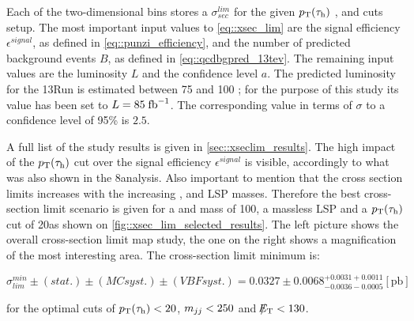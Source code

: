 Each of the two-dimensional bins stores a $\sigma^{lim}_{sec}$ for the given $p_{\text{T}}(\tau_{\text{h}})$ , \mjj and \met cuts setup. The most important input values to \autoref{eq::xsec_lim} are the signal efficiency $\epsilon^{signal}$, as defined in \autoref{eq::punzi_efficiency},  and the number of predicted background events $B$, as defined in \autoref{eq::qcdbgpred_13tev}. The remaining input values are the luminosity $L$ and the confidence level $a$. The predicted luminosity for the 13\tev Run \cite{Bruning:2002yh} is estimated between 75 and 100 \invfb; for the purpose of this study its value has been set to $L = 85\;\text{fb}^{-1}$. The corresponding value in terms of $\sigma$ to a confidence level of 95\%  is $2.5$.

A full list of the study results is given in \autoref{sec::xseclim_results}. The high impact of the $p_{\text{T}}(\tau_{\text{h}})$ cut over the signal efficiency $\epsilon^{signal}$ is visible, accordingly to what was also shown in the 8\tev analysis. Also important to mention that the cross section limits increases with the increasing \charginopm, \neutralinotwo and LSP masses. Therefore the best cross-section limit scenario is given for a \charginopm and \neutralinotwo mass of 100\gev, a massless LSP and a $p_{\text{T}}(\tau_{\text{h}})$ cut of 20\gev as shown on \autoref{fig::xsec_lim_selected_results}. The left picture shows the overall cross-section limit map study, the one on the right shows a magnification of the most interesting area. The cross-section limit minimum is:

\begin{equation}
\sigma_{lim}^{min}\pm(stat.)\pm(MC syst.)\pm(VBF syst.) = 0.0327\pm0.0068^{+0.0031+ 0.0011}_{-0.0036-0.0005} [\text{pb}]
\label{eq::xsec_lim_best_result}
\end{equation}

for the optimal cuts of  $p_{\text{T}}(\tau_{\text{h}}) <  20$,  $ m_{jj}< 250 $ and $\slash\mkern-12mu{E}_{\text{T}} < 130$.

